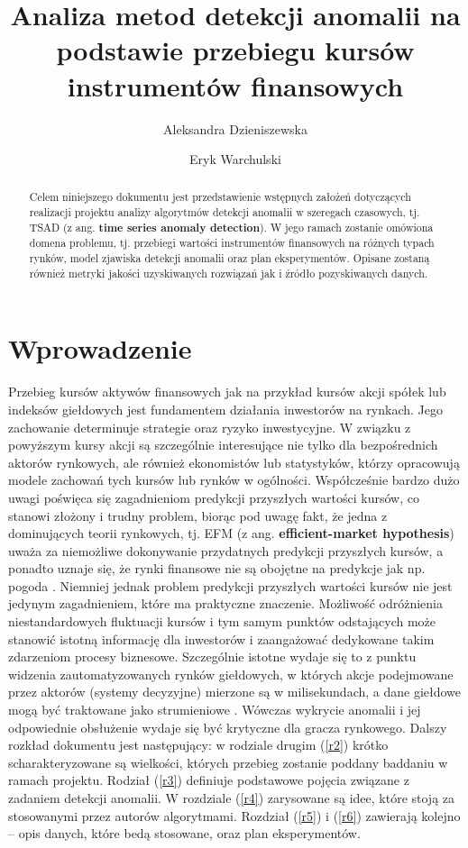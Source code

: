 \documentclass{article}
\title{Analiza metod detekcji anomalii na podstawie przebiegu kursów
instrumentów finansowych}
\author{Aleksandra Dzieniszewska \and Eryk Warchulski}
\date{}
\begin{document}
\maketitle
\begin{abstract}
  Celem niniejszego dokumentu jest przedstawienie wstępnych założeń
  dotyczących realizacji projektu analizy algorytmów detekcji anomalii w
  szeregach czasowych, tj. TSAD (z ang. \textbf{time series anomaly
  detection}). W jego ramach zostanie omówiona domena problemu, tj.
  przebiegi wartości instrumentów finansowych na różnych typach rynków,
  model zjawiska detekcji anomalii oraz plan eksperymentów. Opisane
  zostaną również metryki jakości uzyskiwanych rozwiązań jak i źródło
  pozyskiwanych danych.
\end{abstract}

\section{Wprowadzenie}


  Przebieg kursów aktywów finansowych jak na przykład kursów akcji
  spółek lub indeksów giełdowych jest fundamentem działania inwestorów na
  rynkach. Jego zachowanie determinuje strategie oraz ryzyko inwestycyjne.
  W związku z powyższym  kursy akcji są szczególnie interesujące nie
  tylko dla bezpośrednich aktorów rynkowych, ale również ekonomistów lub
  statystyków, którzy opracowują modele zachowań tych kursów lub rynków w
  ogólności. Współcześnie bardzo dużo uwagi poświęca się zagadnieniom
  predykcji przyszłych wartości kursów, co stanowi złożony i trudny
  problem, biorąc pod uwagę fakt, że jedna z dominujących teorii
  rynkowych, tj. EFM (z ang. \textbf{efficient-market hypothesis}) uważa
  za niemożliwe dokonywanie przydatnych predykcji \cite{RandomWalk}
  przyszłych kursów, a ponadto uznaje się, że rynki finansowe nie są
  obojętne na predykcje jak np. pogoda \cite{Sapiens}. Niemniej jednak
  problem predykcji przyszłych wartości kursów nie jest jedynym
  zagadnieniem, które ma praktyczne znaczenie. Możliwość odróżnienia
  niestandardowych fluktuacji kursów i tym samym punktów odstających może
  stanowić istotną informację dla inwestorów i zaangażować dedykowane
  takim zdarzeniom procesy biznesowe. Szczególnie istotne wydaje się to z
  punktu widzenia zautomatyzowanych rynków giełdowych, w których akcje
  podejmowane przez aktorów (systemy decyzyjne) mierzone są w
  milisekundach, a dane giełdowe mogą być traktowane jako strumieniowe
  \cite{HFT-wiki}. Wówczas wykrycie anomalii i jej odpowiednie obsłużenie
  wydaje się być krytyczne dla gracza rynkowego.
  \newline
  Dalszy rozkład dokumentu jest następujący: w rodziale drugim (\ref{r2}) krótko
  scharakteryzowane są wielkości, których przebieg zostanie poddany baddaniu w ramach projektu. Rodział (\ref{r3}) definiuje podstawowe pojęcia związane z zadaniem detekcji anomalii. W rozdziale (\ref{r4}) zarysowane są idee, które stoją za stosowanymi przez autorów algorytmami. Rozdział (\ref{r5}) i (\ref{r6}) zawierają kolejno -- opis danych, które bedą stosowane, oraz plan eksperymentów. 
\end{document}

